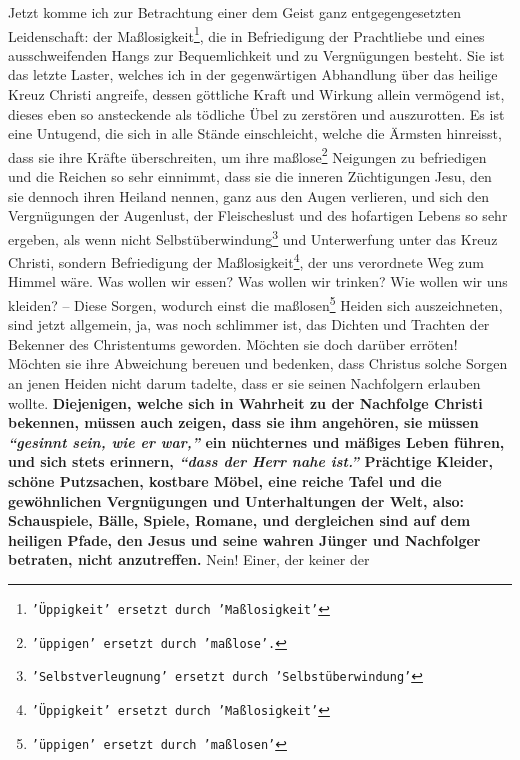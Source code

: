 Jetzt komme ich zur Betrachtung einer dem Geist ganz entgegengesetzten
Leidenschaft: der Maßlosigkeit\footnote{\texttt{'Üppigkeit' ersetzt durch
'Maßlosigkeit'}}, die in Befriedigung der Prachtliebe und
eines
ausschweifenden Hangs zur
Bequemlichkeit und zu Vergnügungen
besteht. Sie ist
das letzte Laster, welches ich in der gegenwärtigen Abhandlung
über das heilige
Kreuz Christi angreife, dessen göttliche Kraft und Wirkung allein vermögend ist,
dieses eben so ansteckende als tödliche Übel zu
zerstören und auszurotten. Es
ist eine Untugend, die sich in alle Stände einschleicht, welche
die Ärmsten
hinreisst, dass sie ihre Kräfte überschreiten, um ihre
maßlose\footnote{\texttt{'üppigen' ersetzt durch 'maßlose'.}} Neigungen zu
befriedigen und die Reichen so sehr einnimmt, dass sie die inneren Züchtigungen
Jesu, den sie dennoch ihren
Heiland nennen, ganz aus den Augen verlieren, und sich
den Vergnügungen der Augenlust, der
Fleischeslust und des
hofartigen Lebens so
sehr ergeben, als wenn nicht
Selbstüberwindung\footnote{\texttt{'Selbstverleugnung' ersetzt
durch 'Selbstüberwindung'}}
 und Unterwerfung
unter das Kreuz
Christi, sondern Befriedigung der Maßlosigkeit\footnote{\texttt{'Üppigkeit'
ersetzt durch 'Maßlosigkeit'}},
der uns verordnete Weg zum Himmel
wäre. Was wollen wir essen? Was wollen wir trinken? Wie wollen wir uns kleiden?
-- Diese Sorgen, wodurch einst die maßlosen\footnote{\texttt{'üppigen' ersetzt
durch 'maßlosen'}}
Heiden sich auszeichneten, sind jetzt
allgemein, ja, was noch schlimmer ist, das Dichten und Trachten
der Bekenner des
Christentums geworden. Möchten sie doch darüber erröten! Möchten sie ihre
Abweichung bereuen und bedenken, dass Christus solche
Sorgen an jenen Heiden
nicht darum tadelte, dass er sie seinen Nachfolgern erlauben wollte.
\label{ref:14_01_wahre_nachfolger} \textbf{Diejenigen,
welche sich in Wahrheit zu der Nachfolge Christi bekennen, müssen auch zeigen,
dass sie ihm angehören, sie müssen
\textit{"`gesinnt sein, wie er war,"'} ein nüchternes
und mäßiges Leben führen, und sich stets erinnern,
\textit{"`dass der Herr nahe ist."'}
Prächtige Kleider, schöne Putzsachen, kostbare
Möbel,
eine reiche Tafel und die
gewöhnlichen Vergnügungen und
Unterhaltungen der Welt,
also: Schauspiele, Bälle,
Spiele, Romane, und dergleichen sind auf dem
heiligen Pfade,
den Jesus und seine wahren
Jünger und Nachfolger betraten, nicht anzutreffen.} Nein! Einer, der keiner der
